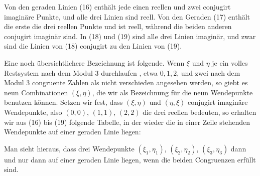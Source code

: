 

Von den geraden Linien (16) enthält jede einen reellen
und zwei conjugirt imaginäre Punkte, und alle drei Linien sind
reell. Von den Geraden (17) enthält die erste die drei reellen
Punkte und ist reell, während die beiden anderen conjugirt
imaginär sind. In (18) und (19) sind alle drei Linien imaginär,
und zwar sind die Linien von (18) conjugirt zu den Linien
von (19).

Eine noch übersichtlichere Bezeichnung ist folgende. Wenn
$\xi$ und $\eta$ je ein volles Restsystem nach dem Modul 3 durchlaufen
, etwa $0, 1, 2$, und zwei nach dem Modul 3 congruente
Zahlen als nicht verschieden angesehen werden, so giebt es neun
Combinationen $(\xi, \eta)$, die wir als Bezeichnung für die neun
Wendepunkte benutzen können. Setzen wir fest, dass $(\xi, \eta)$ und
$(\eta, \xi)$ conjugirt imaginäre Wendepunkte, also $(0, 0)$, $(1, 1)$, $(2, 2)$
die drei reellen bedeuten, so erhalten wir aus (16) bis (19) folgende
 Tabelle, in der wieder die in einer Zeile stehenden Wendepunkte
 auf einer geraden Linie liegen:

Man sieht hieraus, dass drei Wendepunkte $(\xi_1, \eta_1)$, $(\xi_2, \eta_2)$,
$(\xi_3, \eta_3)$ dann und nur dann auf einer geraden Linie liegen, wenn
die beiden Congruenzen
erfüllt sind.
